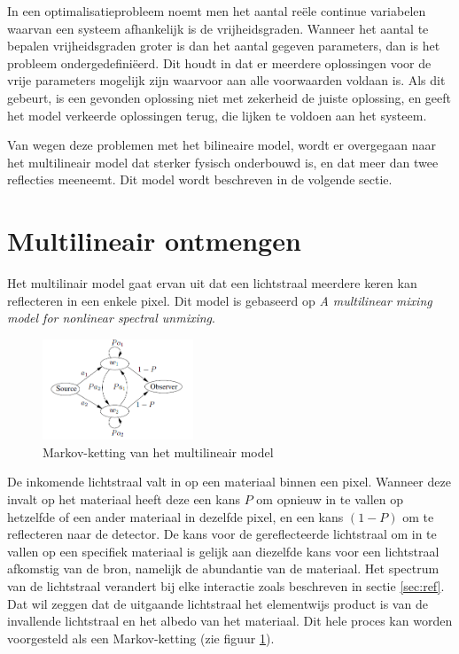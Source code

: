 \documentclass[12pt]{report}
\begin{document}
In een optimalisatieprobleem noemt men het aantal re\"ele continue variabelen waarvan een systeem afhankelijk is de vrijheidsgraden. Wanneer het aantal te bepalen vrijheidsgraden groter is dan het aantal gegeven parameters, dan is het probleem ondergedefini\"eerd. Dit houdt in dat er meerdere  oplossingen voor de vrije parameters mogelijk zijn waarvoor aan alle voorwaarden voldaan is. Als dit gebeurt, is een gevonden oplossing niet met zekerheid de juiste oplossing, en geeft het model verkeerde oplossingen terug, die lijken te voldoen aan het systeem.

Van wegen deze problemen met het bilineaire model, wordt er overgegaan naar het multilineair model dat sterker fysisch onderbouwd is, en dat meer dan twee reflecties meeneemt. Dit model wordt beschreven in de volgende sectie.

\section{Multilineair ontmengen} \label{sec:multi}

Het multilinair model gaat ervan uit dat een lichtstraal meerdere keren kan reflecteren in een enkele pixel. Dit model is gebaseerd op \textit{A multilinear mixing model for nonlinear spectral unmixing}\cite{mlinmix}. 

\begin{figure}
\includegraphics[width=0.4\textwidth]{multi.PNG}
\caption{Markov-ketting van het multilineair model \label{fig:multi}}
\end{figure}

De inkomende lichtstraal valt in op een materiaal binnen een pixel. Wanneer deze invalt op het materiaal heeft deze een kans $P$ om opnieuw in te vallen op hetzelfde of een ander materiaal in dezelfde pixel, en een kans $(1 - P)$ om te reflecteren naar de detector. De kans voor de gereflecteerde lichtstraal om in te vallen op een specifiek materiaal is gelijk aan diezelfde kans voor een lichtstraal afkomstig van de bron, namelijk de abundantie van de materiaal. Het spectrum van de lichtstraal verandert bij elke interactie zoals beschreven in sectie \ref{sec:ref}. Dat wil zeggen dat de uitgaande lichtstraal het elementwijs product is van de invallende lichtstraal en het albedo van het materiaal.
Dit hele proces kan worden voorgesteld als een Markov-ketting (zie figuur \ref{fig:multi}).
\end{document}
